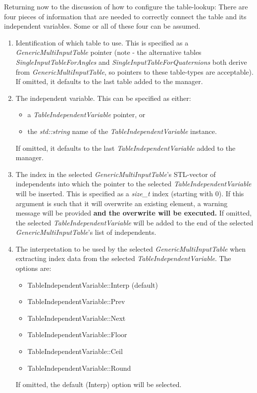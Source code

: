 \documentclass[11pt,fleqn]{report}
\begin{document}
Returning now to the discussion of how to configure the table-lookup:
There are four pieces of information that are needed to correctly connect
the table and its independent variables.  Some or all of these four can be
assumed.
\begin{enumerate}
 \item Identification of which table to use.  This is specified as a
  \textit{GenericMultiInputTable} pointer (note - the alternative tables
  \textit{SingleInputTableForAngles} and
  \textit{SingleInputTableForQuaternions} both derive from
  \textit{GenericMultiInputTable}, so pointers to these table-types are
  acceptable).  If omitted, it defaults to the
  last table added to the manager.

 \item The independent variable.  This can be specified as either:
 \begin{itemize}
  \item a \textit{TableIndependentVariable} pointer, or
  \item the \textit{std::string} name of the
        \textit{TableIndependentVariable} instance.
 \end{itemize}
 If omitted, it defaults to the last \textit{TableIndependentVariable}
 added to the manager.

 \item The index in the selected \textit{GenericMultiInputTable}'s
  STL-vector of independents into which the pointer to the selected
  \textit{TableIndependentVariable} will be inserted. This is specified as a
  \textit{size\_t} index (starting with 0).   If this argument is such that
  it will overwrite an existing element, a warning message will be provided
  \textbf{and the overwrite will be executed.}  If omitted, the selected
  \textit{TableIndependentVariable} will be added to the end of the selected
  \textit{GenericMultiInputTable}'s list of independents.

 \item The interpretation to be used by the selected
 \textit{GenericMultiInputTable} when extracting index data from the selected
 \textit{TableIndependentVariable}.  The options are:
  \begin{itemize}
   \item TableIndependentVariable::Interp (default)
   \item TableIndependentVariable::Prev
   \item TableIndependentVariable::Next
   \item TableIndependentVariable::Floor
   \item TableIndependentVariable::Ceil
   \item TableIndependentVariable::Round
  \end{itemize}
  If omitted, the default (Interp) option will be selected.
\end{enumerate}
\end{document}
